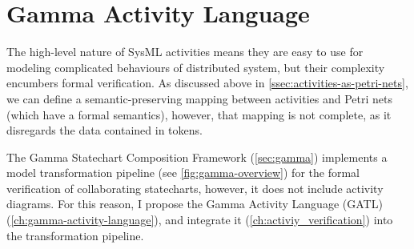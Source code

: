 \chapter{Gamma Activity Language}\label{ch:gamma-activity-language}

The high-level nature of SysML activities means they are easy to use for modeling complicated behaviours of distributed system, but their complexity encumbers formal verification. As discussed above in \autoref{ssec:activities-as-petri-nets}, we can define a semantic-preserving mapping between activities and Petri nets (which have a formal semantics), however, that mapping is not complete, as it disregards the data contained in tokens.

The Gamma Statechart Composition Framework (\autoref{sec:gamma}) implements a model transformation pipeline (see \autoref{fig:gamma-overview}) for the formal verification of collaborating statecharts, however, it does not include activity diagrams. For this reason, I propose the Gamma Activity Language (GATL) (\autoref{ch:gamma-activity-language}), and integrate it (\autoref{ch:activiy_verification}) into the transformation pipeline.




